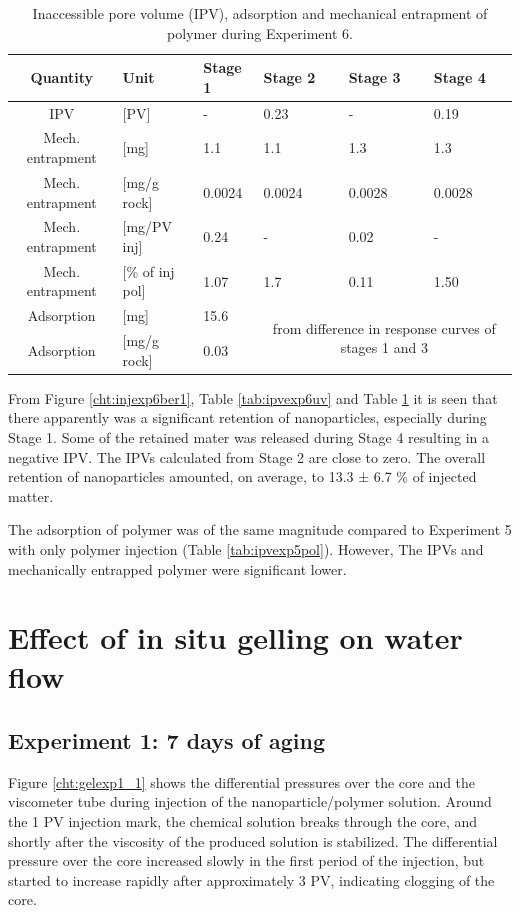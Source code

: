 \begin{table}[p]
\small
\centering
\caption{Inaccessible pore volume (IPV), adsorption and mechanical entrapment of polymer during Experiment 6.}
\label{tab:ipvexp6pol}
\begin{tabular}{c l l l l l } 
\toprule
\textbf{Quantity} & \textbf{Unit} & \textbf{Stage 1} & \textbf{Stage 2} & \textbf{Stage 3} & \textbf{Stage 4} \\ 
\midrule 
IPV                & [PV]           & -         & 0.23     & -         & 0.19     \\
Mech. entrapment   & [mg]          & 1.1       & 1.1      & 1.3       & 1.3       \\ 
Mech. entrapment   & [mg/g rock]   & 0.0024   & 0.0024     & 0.0028     & 0.0028     \\ 
Mech. entrapment   & [mg/PV inj]   & 0.24      & -         & 0.02      & -         \\
Mech. entrapment   & [\% of inj pol]& 1.07       & 1.7       & 0.11       & 1.50       \\ 
Adsorption         & [mg]          & 15.6      &   \multicolumn{3}{c}{\multirow{2}{15em}{from difference in response curves of stages 1 and 3}}        \\
Adsorption         & [mg/g rock]   & 0.03      &  \multicolumn{3}{c}{}    \\ 
\bottomrule
\end{tabular}
\end{table}


From Figure \ref{cht:injexp6ber1},  Table \ref{tab:ipvexp6uv} and Table \ref{tab:ipvexp6pol} it is seen that there apparently was a significant retention of nanoparticles, especially during Stage 1. Some of the retained mater was released during Stage 4 resulting in a negative IPV. The IPVs calculated from Stage 2 are close to zero. The overall retention of nanoparticles amounted, on average, to 13.3 ± 6.7 \% of injected matter.

The adsorption of polymer was of the same magnitude compared to Experiment 5 with only polymer injection (Table \ref{tab:ipvexp5pol}). However, The IPVs and mechanically entrapped polymer were significant lower.



\section{ Effect of in situ gelling on water flow}
\subsection{Experiment 1: 7 days of aging}
 Figure \ref{cht:gelexp1_1} shows the differential pressures over the core and the viscometer tube during injection of the nanoparticle/polymer solution. Around the 1 PV injection mark, the chemical solution breaks through the core, and shortly after the viscosity of the produced solution is stabilized. The differential pressure over the core increased slowly in the first period of the injection, but started to increase rapidly after approximately 3 PV, indicating clogging of the core.

